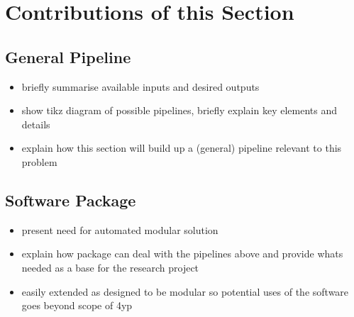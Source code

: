 \section{Contributions of this Section}
\label{sec:pl-overview}
    
    \subsection{General Pipeline}
    \label{subsec:pl-overview-general}
        \begin{itemize}
            \item{briefly summarise available inputs and desired outputs}
            \item{show tikz diagram of possible pipelines, briefly explain key elements and details}
            \item{explain how this section will build up a (general) pipeline relevant to this problem}
        \end{itemize}
    
    \subsection{Software Package}
    \label{subsec:pl-overview-software}
        \begin{itemize}
            \item{present need for automated modular solution}
            \item{explain how package can deal with the pipelines above and provide whats needed as a base for the research project}
            \item{easily extended as designed to be modular so potential uses of the software goes beyond scope of 4yp}
        \end{itemize}
    
    